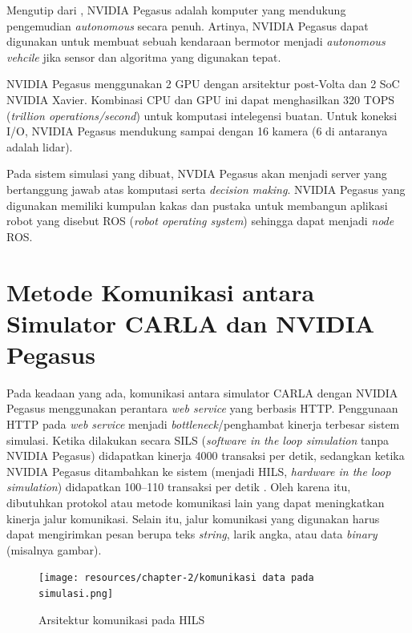 Mengutip dari \parencite{oh_2017}, NVIDIA Pegasus adalah komputer yang mendukung
pengemudian \textit{autonomous} secara penuh. Artinya, NVIDIA Pegasus dapat
digunakan untuk membuat sebuah kendaraan bermotor menjadi \textit{autonomous
    vehcile} jika sensor dan algoritma yang digunakan tepat.

NVIDIA Pegasus menggunakan 2 GPU dengan arsitektur post-Volta dan 2 SoC NVIDIA
Xavier. Kombinasi CPU dan GPU ini dapat menghasilkan 320 TOPS (\textit{trillion
    operations/second}) untuk komputasi intelegensi buatan. Untuk koneksi I/O,
NVIDIA Pegasus mendukung sampai dengan 16 kamera (6 di antaranya adalah lidar).

Pada sistem simulasi yang dibuat, NVDIA Pegasus akan menjadi server yang
bertanggung jawab atas komputasi serta \textit{decision making}. NVIDIA Pegasus
yang digunakan memiliki kumpulan kakas dan pustaka untuk membangun aplikasi
robot yang disebut ROS (\textit{robot operating system}) sehingga dapat menjadi
\textit{node} ROS.

\section{Metode Komunikasi antara Simulator CARLA dan NVI\-DI\-A Pegasus}

Pada keadaan yang ada, komunikasi antara simulator CARLA dengan NVIDIA Pegasus
menggunakan perantara \textit{web service} yang berbasis HTTP. Penggunaan HTTP
pada \textit{web service} menjadi \textit{bottleneck}/penghambat kinerja
terbesar sistem simulasi. Ketika dilakukan secara SILS (\textit{software in the
    loop simulation} tanpa NVIDIA Pegasus) didapatkan kinerja 4000 transaksi per
detik, sedangkan ketika NVIDIA Pegasus ditambahkan ke sistem (menjadi HILS,
\textit{hardware in the loop simulation}) didapatkan 100--110 transaksi per
detik \parencite{trilaksono_laporanRispro}. Oleh karena itu, dibutuhkan protokol
atau metode komunikasi lain yang dapat meningkatkan kinerja jalur komunikasi.
Selain itu, jalur komunikasi yang digunakan harus dapat mengirimkan pesan berupa
teks \textit{string}, larik angka, atau data \textit{binary} (misalnya gambar).

\begin{figure}
    \begin{center}
        \texttt{[image: resources/chapter-2/komunikasi
            data pada simulasi.png]}
        \caption{Arsitektur komunikasi pada HILS
            \parencite{trilaksono_laporanRispro}}
    \end{center}
\end{figure}

